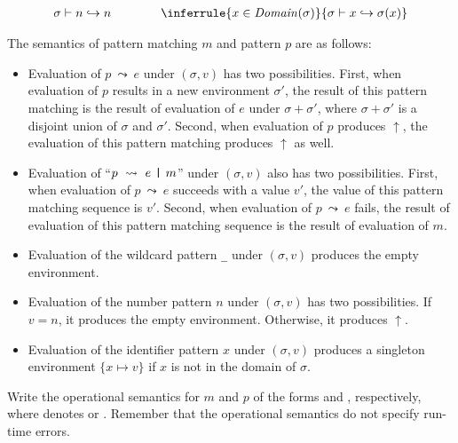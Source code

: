 \begin{exercise}
\[
\begin{array}{c}
  \sigma \vdash n \hookrightarrow n
  \qquad\qquad
  \inferrule
  {x \in \dom{\sigma}}
  {\sigma \vdash x \hookrightarrow \sigma(x)}
\end{array}
\]

The semantics of pattern matching $m$ and pattern $p$ are as follows:
\begin{itemize}
\item Evaluation of $p\ \leadsto\ e$ under $(\sigma, v)$ has two possibilities.
First, when evaluation of $p$ results in a new environment $\sigma'$,
the result of this pattern matching is the result of evaluation of $e$ under $\sigma+\sigma'$,
where $\sigma+\sigma'$ is a disjoint union of $\sigma$ and $\sigma'$.
Second, when evaluation of $p$ produces $\uparrow$,
the evaluation of this pattern matching produces $\uparrow$ as well.
\item Evaluation of ``$p\ \leadsto\ e\ \verb!|!\ m$'' under $(\sigma, v)$
also has two possibilities.
First, when evaluation of $p\ \leadsto\ e$ succeeds with a value $v'$,
the value of this pattern matching sequence is $v'$.
Second, when evaluation of $p\ \leadsto\ e$ fails,
the result of evaluation of this pattern matching sequence is
the result of evaluation of $m$.
\item Evaluation of the wildcard pattern \verb!_! under $(\sigma, v)$
produces the empty environment.
\item Evaluation of the number pattern $n$ under $(\sigma, v)$ has two possibilities.
If $v=n$,
it produces the empty environment.  Otherwise, it produces $\uparrow$.
\item Evaluation of the identifier pattern $x$ under $(\sigma, v)$
produces a singleton environment $\{x \mapsto v\}$
if $x$ is not in the domain of $\sigma$.
\end{itemize}
Write the operational semantics for $m$ and $p$
of the forms  and
, respectively,
where  denotes
 or
.
Remember that the operational semantics do not specify run-time errors.

\end{exercise}

